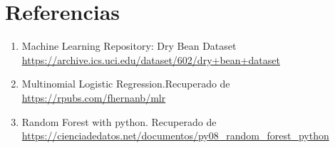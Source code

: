 \documentclass[letterpaper,spanish,reprint,nofootinbib,showkeys,aps]{revtex4-2}
\begin{document}
\onecolumngrid

\section*{Referencias}

\begin{enumerate}
	\item Machine Learning Repository: Dry Bean Dataset \url{https://archive.ics.uci.edu/dataset/602/dry+bean+dataset}
	
    \item Multinomial Logistic Regression.Recuperado de \url{https://rpubs.com/fhernanb/mlr}
    
    \item Random Forest with python. Recuperado de \url{https://cienciadedatos.net/documentos/py08_random_forest_python}
    
\end{enumerate}









\end{document}
